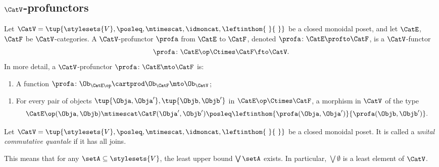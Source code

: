 \subsection{$\CatV$-profunctors}

\begin{ctdefinition}
    \label{def:profunctor-monoidal-poset-enriched}
    Let $\CatV = \tup{\stylesets{V}, \posleq, \mtimescat, \idmoncat, \leftinthom{\ }{\ }}$ be a closed monoidal poset, and let $\CatE$, $\CatF$ be $\CatV$-categories.
    A $\CatV$-profunctor $\profa$ from $\CatE$ to $\CatF$, denoted $\profa \colon \CatE \profto \CatF$, is a $\CatV$-functor
    \begin{equation}
        \profa \colon \CatE\op \Ctimes \CatF \fto \CatV.
    \end{equation}
    In more detail, a $\CatV$-profunctor $\profa \colon \CatE \mto \CatF$ is:

    \constit

    \begin{enumerate}
        \item A function $\profa \colon \Ob_{\CatE\op} \cartprod \Ob_{\CatF} \mto \Ob_\CatV$;
    \end{enumerate}

    \condit

    \begin{enumerate}
        \item For every pair of objects $\tup{\Obja, \Obja'}, \tup{\Objb, \Objb'}$ in $\CatE\op \Ctimes \CatF$, a morphism in $\CatV$ of the type
              \begin{equation}
                  \CatE\op(\Obja, \Objb) \mtimescat \CatF(\Obja', \Objb') \posleq \leftinthom{\profa(\Obja, \Obja')}{\profa(\Objb, \Objb')}.
              \end{equation}
    \end{enumerate}
\end{ctdefinition}

\begin{ctdefinition}
    \label{def:unital-commutative-quantale}
    Let $\CatV = \tup{\stylesets{V}, \posleq, \mtimescat, \idmoncat, \leftinthom{\ }{\ }}$ be a closed monoidal poset.
    It is called a \emph{unital commutative quantale} if it has all joins.

    This means that for any $\setA \subseteq \stylesets{V}$, the least upper bound $\bigvee\setA$ exists.
    In particular, $\bigvee \emptyset$ is a least element of $\CatV$.
\end{ctdefinition}


